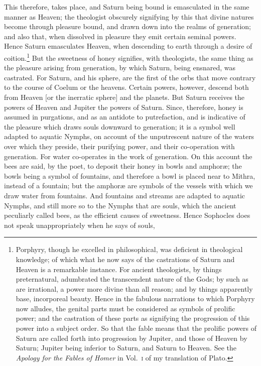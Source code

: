 \documentclass[a4paper,12pt]{article}
\begin{document}
\noindent This therefore, takes place, and Saturn being bound is emasculated in
the same manner as Heaven; the theologist obscurely signifying by this that
divine natures become through pleasure bound, and drawn down into the realms of
generation; and also that, when dissolved in pleasure they emit certain seminal
powers. Hence Saturn emasculates Heaven, when descending to earth through a
desire of coition.\footnote{Porphyry, though he excelled in philosophical, was
deficient in theological knowledge; of which what he now says of the
castrations of Saturn and Heaven is a remarkable instance. For ancient
theologists, by things preternatural, adumbrated the transcendent nature of the
Gods; by such as are irrational, a power more divine than all reason; and by
things apparently base, incorporeal beauty. Hence in the fabulous narrations to
which Porphyry now alludes, the genital parts must be considered as symbols of
prolific power; and the castration of these parts as signifying the progression
of this power into a subject order. So that the fable means that the prolific
powers of Saturn are called forth into progression by Jupiter, and those of
Heaven by Saturn; Jupiter being inferior to Saturn, and Saturn to Heaven. See
the \textit{Apology for the Fables of Homer} in Vol.~\textsc{i} of my
translation of Plato.} But the sweetness of honey signifies, with theologists,
the same thing as the pleasure arising from generation, by which Saturn, being
ensnared, was castrated. For Saturn, and his sphere, are the first of the orbs
that move contrary to the course of Coelum or the heavens. Certain powers,
however, descend both from Heaven [or the inerratic sphere] and the planets.
But Saturn receives the powers of Heaven and Jupiter the powers of Saturn.
Since, therefore, honey is assumed in purgations, and as an antidote to
putrefaction, and is indicative of the pleasure which draws souls downward to
generation; it is a symbol well adapted to aquatic Nymphs, on account of the
unputrescent nature of the waters over which they preside, their purifying
power, and their co-operation with generation. For water co-operates in the
work of generation. On this account the bees are said, by the poet, to deposit
their honey in bowls and amphor{\ae}; the bowls being a symbol of fountains,
and therefore a bowl is placed near to Mithra, instead of a fountain; but the
amphor{\ae} are symbols of the vessels with which we draw water from fountains.
And fountains and streams are adapted to aquatic Nymphs, and still more so to
the Nymphs that are souls, which the ancient peculiarly called bees, as the
efficient causes of sweetness. Hence Sophocles does not speak unappropriately
when he says of souls,
\end{document}
